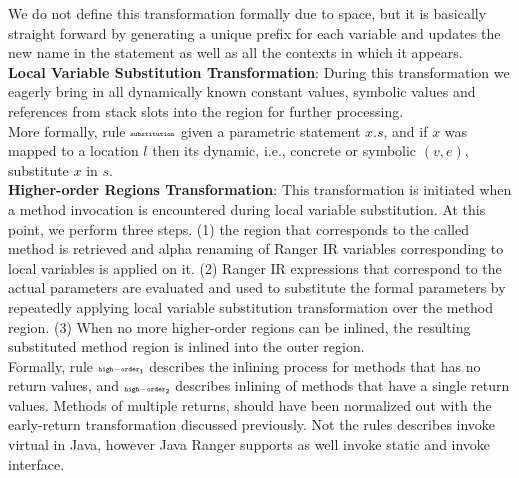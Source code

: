 We do not define this transformation formally due to space, but it is basically straight forward by generating a unique prefix for each variable and updates the new name in the statement as well as all the contexts in which it appears.  \\
%
\textbf{Local Variable Substitution Transformation}: During this transformation we eagerly bring in all dynamically
known constant values, symbolic values and references from stack slots into the region for further processing. \\
More formally, rule $\scriptscriptstyle\mathtt{substitution}$ given a parametric statement $x.s$, and if $x$ was mapped to a location $l$ then its dynamic, i.e., concrete or symbolic $(v, e)$, substitute $x$ in $s$.\\
%
\textbf{Higher-order Regions Transformation}: This transformation is initiated when a method invocation is encountered
during local variable substitution.
%
At this point, we perform three steps.
%
(1) the region that corresponds to the called method is retrieved and alpha renaming of
Ranger IR variables corresponding to local variables is applied on it.
%
(2) Ranger IR expressions that correspond to the actual parameters are evaluated and used to substitute the formal
parameters by repeatedly applying local variable substitution transformation over the method region.
%
(3) When no more higher-order regions can be inlined, the resulting substituted method region is inlined into
the outer region.\\
%
Formally, rule $\scriptscriptstyle\mathtt{high-order_1}$ describes the inlining process for methods that has no return values, and $\scriptscriptstyle\mathtt{high-order_2}$ describes inlining of methods that have a single return values. Methods of multiple returns, should have been normalized out with the early-return transformation discussed previously. Not the rules describes invoke virtual in Java, however Java Ranger supports as well invoke static and invoke interface. 

